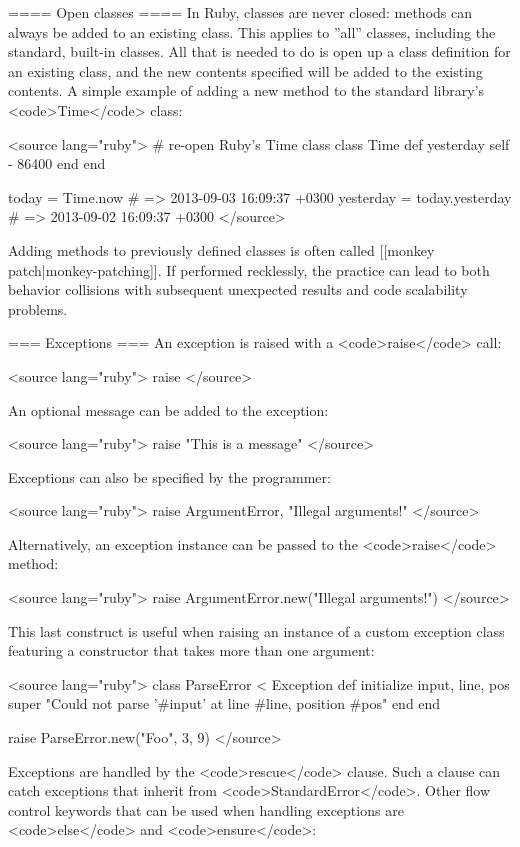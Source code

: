 ==== Open classes ====
In Ruby, classes are never closed: methods can always be added to an existing class. This applies to ''all'' classes, including the standard, built-in classes. All that is needed to do is open up a class definition for an existing class, and the new contents specified will be added to the existing contents. A simple example of adding a new method to the standard library's <code>Time</code> class:

<source lang="ruby">
# re-open Ruby's Time class
class Time
  def yesterday
    self - 86400
  end
end

today = Time.now               # => 2013-09-03 16:09:37 +0300
yesterday = today.yesterday    # => 2013-09-02 16:09:37 +0300
</source>

Adding methods to previously defined classes is often called [[monkey patch|monkey-patching]]. If performed recklessly, the practice can lead to both behavior collisions with subsequent unexpected results and code scalability problems.

=== Exceptions ===
An exception is raised with a <code>raise</code> call:

<source lang="ruby">
raise
</source>

An optional message can be added to the exception:

<source lang="ruby">
raise "This is a message"
</source>

Exceptions can also be specified by the programmer:

<source lang="ruby">
raise ArgumentError, "Illegal arguments!"
</source>

Alternatively, an exception instance can be passed to the <code>raise</code> method:

<source lang="ruby">
raise ArgumentError.new("Illegal arguments!")
</source>

This last construct is useful when raising an instance of a custom exception class featuring a constructor that takes more than one argument:

<source lang="ruby">
class ParseError < Exception
  def initialize input, line, pos
    super "Could not parse '#{input}' at line #{line}, position #{pos}"
  end
end

raise ParseError.new("Foo", 3, 9)
</source>

Exceptions are handled by the <code>rescue</code> clause. Such a clause can catch exceptions that inherit from <code>StandardError</code>. Other flow control keywords that can be used when handling exceptions are <code>else</code> and <code>ensure</code>:

